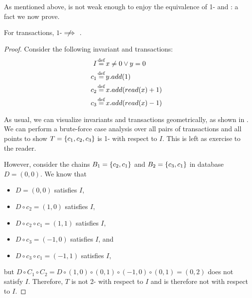 As mentioned above, \wimp{} is not weak enough to enjoy the equivalence of
1-\iconfluence{} and \iconfluence{}: a fact we now prove.

\begin{theorem}\label{thm:wimp-1-iconfluence}
  For \wimp{} transactions, $1$-\iconfluence $\centernot \implies$ \iconfluence.
\end{theorem}
\begin{proof}
  Consider the following invariant and \wimp{} transactions:
  \begin{align*}
    I   &\defeq x \neq 0 \lor y = 0 \\
    c_1 &\defeq y.add(1) \\
    c_2 &\defeq x.add(read(x) + 1) \\
    c_3 &\defeq x.add(read(x) - 1)
  \end{align*}

  As usual, we can visualize invariants and transactions geometrically, as
  shown in . We can perform a brute-force case analysis over
  all pairs of transactions and all points to show $T = \left\{c_1, c_2, c_3\right\}$ is
  1-\iconfluent{} with respect to $I$. This is left as exercise to the reader.

  However, consider the \wimp{} chains $B_1 = \left\{c_2, c_1\right\}$ and $B_2 =
  \left\{c_3, c_1\right\}$ in database $D = (0, 0)$. We know that
  \begin{itemize}
    \item $D = (0, 0)$ satisfies $I$,
    \item $D \circ c_2 = (1, 0)$ satisfies $I$,
    \item $D \circ c_2 \circ c_1 = (1, 1)$ satisfies $I$,
    \item $D \circ c_3 = (-1, 0)$ satisfies $I$, and
    \item $D \circ c_3 \circ c_1 = (-1, 1)$ satisfies $I$,
  \end{itemize}
  but $D \circ C_1 \circ C_2 = D \circ (1, 0) \circ (0, 1) \circ (-1, 0) \circ
  (0, 1) = (0, 2)$ does not satisfy $I$. Therefore, $T$ is not 2-\iconfluent
  with respect to $I$ and is therefore not \iconfluent with respect to $I$.
\end{proof}


\newcommand{\width}{2}
\newcommand{\smallwidth}{1}
\newcommand{\height}{2}

